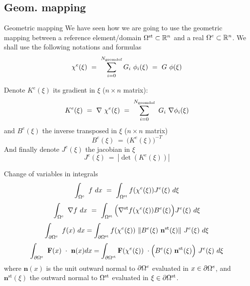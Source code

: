 \subsection{Geom. mapping}
\label{sec:geom.-mapping}
\begin{frame}{Geometric mapping}
  We have seen how we are going to use the geometric mapping between a
  reference element/domain ${\Omega^{\text{st}}} \subset {\ensuremath{\mathbb{R}^{n}}}$ and a real ${\Omega^{e}} \subset {\ensuremath{\mathbb{R}^{n}}}$.
  We shall use the following notations  and formulas
  \begin{equation}
    \label{eq:66}
    \chi^e( \xi )\ =\ \sum_{i=0}^{\ngdof} G_i\ \phi_i (\xi)\ =\ G\ \phi(\xi) 
  \end{equation}
  
  Denote $K^e(\xi)$ its gradient in $\xi$ ($n\times n$ matrix):
  \begin{equation}
    \label{eq:67}
    K^e( \xi )\ =\ \nabla\ \chi^e (\xi )\ =\ \sum_{i=0}^{\ngdof}\ G_i\ \nabla \phi_i (\xi)
  \end{equation}
  and $B^e(\xi)$ the inverse transposed in $\xi$ ($n\times n$ matrix)
  \begin{equation}
    \label{eq:68}
    B^e( \xi )\ =\ \Big(K^e(\xi)\Big)^{-T}
  \end{equation}
  And finally denote $J^e(\xi)$ the jacobian in $\xi$
  \begin{equation}
    \label{eq:69}
    J^e(\xi)\ =\ |\det( K^e(\xi) )|
  \end{equation}
\end{frame}

\begin{frame}{Change of variables in integrals}
    \begin{equation}
      \label{eq:71}
      \int_{{\Omega^{e}}} \ f\ dx\ =\ \int_{{\Omega^{\text{st}}}} f( \chi^e(\xi) ) J^e( \xi )\ d \xi
  \end{equation}
  \begin{equation}
    \label{eq:70}
    \int_{{\Omega^{e}}}\ \nabla f\ dx\ =\ \int_{{\Omega^{\text{st}}}} \Big(\nabla^{\text{st}} f( \chi^e(\xi) ) B^e(\xi)\Big) J^e( \xi )\ d \xi
  \end{equation}
  \begin{equation}
    \label{eq:65}
    \int_{\partial {\ensuremath{\Omega^{e}}}}\ f( x )\ dx = \int_{\partial {\ensuremath{\Omega^{\text{st}}}}} f( \chi^e(\xi) )\  \| B^e(\xi) \ \mathbf{n^{\text{st}}}(\xi) \|\ J^e( \xi )\ d \xi
  \end{equation}
    \begin{equation}
      \label{eq:63}
      \int_{\partial \Om{e}}\ \mathbf{F}( x )\ \cdot\ \mathbf{n}(x) dx = \int_{\partial \Omst} \mathbf{F}( \chi^e(\xi) )\  \cdot \Big(B^e(\xi) \ \mathbf{n^{\text{st}}}(\xi) \Big) \ J^e( \xi )\ d \xi
  \end{equation}
  where $\mathbf{n}(x)$ is the \alert{unit outward normal} to $\partial {\ensuremath{\Omega^{e}}}$
  evaluated in $x \in \partial {\ensuremath{\Omega^{e}}}$, and $\mathbf{n}^{\text{st}}(\xi)$
  the outward normal to ${\Omega^{\text{st}}}$ evaluated in $\xi \in \partial {\ensuremath{\Omega^{\text{st}}}}$.
\end{frame}

